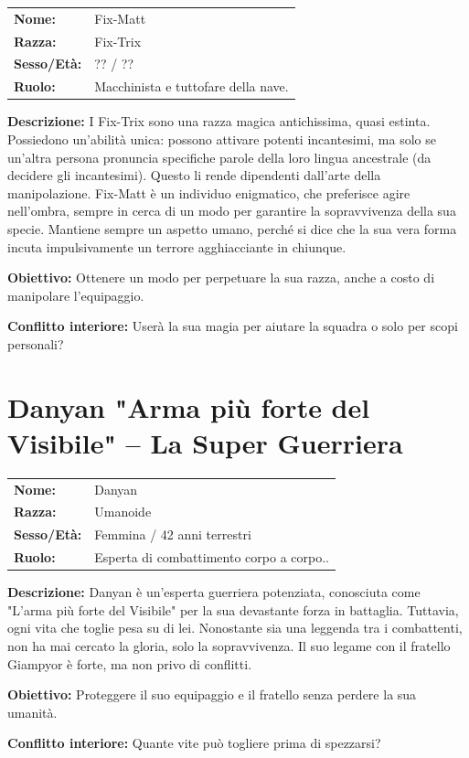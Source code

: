 \documentclass[11pt,a4paper]{article}
\begin{document}
\begin{tcolorbox}[colback=mininglightorange!20, colframe=miningorange]
\begin{tabularx}{\textwidth}{lX}
\textbf{Nome:} & Fix-Matt \\
\textbf{Razza:} & Fix-Trix \\
\textbf{Sesso/Età:} & ?? / ?? \\
\textbf{Ruolo:} & Macchinista e tuttofare della nave. \\
\end{tabularx}

\textbf{Descrizione:} I Fix-Trix sono una razza magica antichissima, quasi estinta. Possiedono un’abilità unica: possono attivare potenti incantesimi, ma solo se un’altra persona pronuncia specifiche parole della loro lingua ancestrale (da decidere gli incantesimi). Questo li rende dipendenti dall’arte della manipolazione. Fix-Matt è un individuo enigmatico, che preferisce agire nell’ombra, sempre in cerca di un modo per garantire la sopravvivenza della sua specie.
Mantiene sempre un aspetto umano, perché si dice che la sua vera forma incuta impulsivamente un terrore agghiacciante in chiunque. 



\textbf{Obiettivo:} Ottenere un modo per perpetuare la sua razza, anche a costo di manipolare l’equipaggio.

\textbf{Conflitto interiore:} Userà la sua magia per aiutare la squadra o solo per scopi personali?
\end{tcolorbox}


\section{Danyan "Arma più forte del Visibile" – La Super Guerriera}

\begin{tcolorbox}[colback=mininglightorange!20, colframe=miningorange]
\begin{tabularx}{\textwidth}{lX}
\textbf{Nome:} & Danyan \\
\textbf{Razza:} & Umanoide \\
\textbf{Sesso/Età:} & Femmina / 42 anni terrestri \\
\textbf{Ruolo:} & Esperta di combattimento corpo a corpo.. \\
\end{tabularx}

\textbf{Descrizione:} Danyan è un’esperta guerriera potenziata, conosciuta come "L’arma più forte del Visibile" per la sua devastante forza in battaglia. Tuttavia, ogni vita che toglie pesa su di lei. Nonostante sia una leggenda tra i combattenti, non ha mai cercato la gloria, solo la sopravvivenza. Il suo legame con il fratello Giampyor è forte, ma non privo di conflitti.


\textbf{Obiettivo:} Proteggere il suo equipaggio e il fratello senza perdere la sua umanità.

\textbf{Conflitto interiore:} Quante vite può togliere prima di spezzarsi?
\end{tcolorbox}
\end{document}
